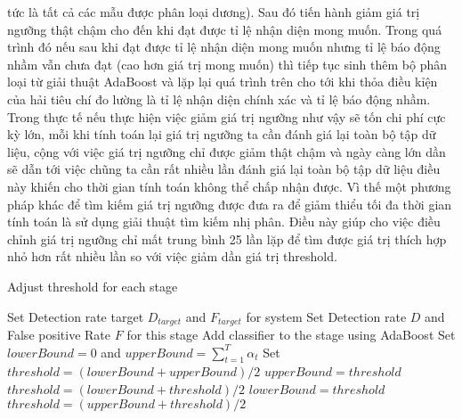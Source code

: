 \documentclass[12pt,a4paper]{article}
\begin{document}
tức là tất cả các mẫu được phân loại dương). Sau đó tiến hành giảm giá trị ngưỡng thật chậm cho đến khi đạt được tỉ lệ nhận diện mong muốn. Trong quá trình đó nếu sau khi đạt được tỉ lệ nhận diện mong muốn nhưng  tỉ lệ báo động nhầm vẫn chưa đạt (cao hơn giá trị mong muốn) thì tiếp tục sinh thêm bộ phân loại từ giải thuật AdaBoost và lặp lại quá trình trên cho tới khi thỏa điều kỉện của hải tiêu chí đo lường là tỉ lệ nhận diện chính xác và tỉ lệ báo động nhầm. Trong thực tế nếu thực hiện việc giảm giá trị ngưỡng như vậy sẽ tốn chi phí cực kỳ lớn, mỗi khi tính toán lại giá trị ngưỡng ta cần đánh giá lại toàn bộ tập dữ liệu, cộng với việc giá trị ngưỡng chỉ được giảm thật chậm và ngày càng lớn dần sẽ dẫn tới việc chũng ta cần rất nhiều lần đánh giá lại toàn bộ tập dữ liệu điều này khiến cho thời gian tính toán không thể chấp nhận được. Vì thế một phương pháp khác để tìm kiếm giá trị ngưỡng được đưa ra để giảm thiểu tối đa thời gian tính toán là sử dụng giải thuật tìm kiếm nhị phân.
Điều này giúp cho việc điều chỉnh giá trị ngưỡng chỉ mất trung bình 25 lần lặp để tìm được giá trị thích hợp nhỏ hơn rất nhiều lần so với việc giảm dần giá trị threshold.
\begin{algorithm}[H]
\caption{Adjust threshold for each stage}
\begin{algorithmic}[1]
\STATE Set Detection rate target $D_{target}$ and $F_{target}$ for system
\STATE Set Detection rate $D$ and False positive Rate $F$ for this stage
\STATE Add classifier to the stage using AdaBoost
\STATE Set $lowerBound = 0$ and $upperBound = \sum_{t=1}^{T}\alpha_t$
\STATE Set $threshold = (lowerBound + upperBound)/2$
\STATE $upperBound = threshold$
\STATE $threshold = (lowerBound + threshold)/2$
\STATE $lowerBound= threshold$
\STATE $threshold = (upperBound + threshold)/2$
\ENDIF
\ENDWHILE
\ENDWHILE
\end{algorithmic}
\end{algorithm}
\end{document}
